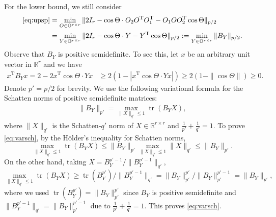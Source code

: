 \documentclass[reqno]{amsart}
\DeclareMathOperator{\tr}{tr}
\newcommand{\T}{\mathrm{T}}
\theoremstyle{plain}
\theoremstyle{definition}
\begin{document}
For the lower bound, we still consider
\begin{align*}
\eqref{eq:upsp}&= \min_{O\in \mathbb{O}^{r\times r}} \| 2 I_r - \cos\Theta \cdot O_2O^\T O_1^\T - O_1 O O_2^\T \cos\Theta\|_{p/2} \nonumber\\
&=\min_{Y\in \mathbb{O}^{r\times r}} \| 2 I_r - \cos\Theta \cdot Y - Y^\T \cos\Theta\|_{p/2}
:=\min_{Y\in \mathbb{O}^{r\times r}} \| B_Y \|_{p/2}.
\end{align*}
Observe that $B_Y$ is positive semidefinite. To see this, let $x$ be an arbitrary unit vector in $\mathbb R^r$ and we have
\begin{align*}
x^\T B_Yx = 2 - 2 x^\T \cos\Theta\cdot Y x &\ge 2(1- |x^\T \cos\Theta\cdot Y x|) \ge 2 (1-\|\cos\Theta\|)\ge 0.
\end{align*}
Denote $p'=p/2$ for brevity. We use the following variational formula for the Schatten norms of positive semidefinite matrices:
\begin{align}\label{eq:varsch}
\|B_Y\|_{p'} =\max_{\|X\|_{q'}\le 1} \tr (B_Y X),
\end{align}
where $\|X\|_{q'}$ is the Schatten-$q'$ norm of $X\in \mathbb R^{r\times r}$ and $\frac{1}{p'} + \frac{1}{q'}=1$. To prove \eqref{eq:varsch}, by the H\"older's inequality for Schatten norms, 
$$\max_{\|X\|_{q'}\le 1} \tr (B_Y X) \le \|B_Y\|_{p'}\max_{\|X\|_{q'}\le 1} \|X\|_{q'} \le \|B_Y\|_{p'}.$$
On the other hand, taking $X=B_Y^{p'-1}/\|B_Y^{p'-1}\|_{q'}$,
$$\max_{\|X\|_{q'}\le 1} \tr (B_Y X) \ge \tr(B_Y^{p'})/\|B_Y^{p'-1}\|_{q'}= \|B_Y\|_{p'}^{p'}/\|B_Y\|_{p'}^{p'-1}=\|B_Y\|_{p'},$$
where we used $\tr(B_Y^{p'}) = \|B_Y\|_{p'}^{p'}$ since $B_Y$ is positive semidefinite and $\|B_Y^{p'-1}\|_{q'} = \|B_Y\|_{p'}^{p'-1}$ due to $\frac{1}{p'} + \frac{1}{q'}=1$. This proves \eqref{eq:varsch}.
\end{document}
